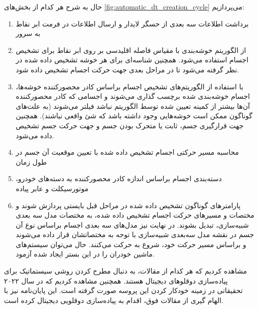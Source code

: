 حال به شرح هر کدام از بخش‌های \cref{fig:automatic_dt_creation_cycle} می‌پردازیم:
\begin{enumerate}
    \item برداشت اطلاعات سه بعدی از حسگر لایدار و ارسال اطلاعات در فرمت ابر نقاط به سرور
    \item از الگوریتم خوشه‌بندی با مقیاس فاصله اقلیدسی بر روی ابر نقاط برای تشخیص اجسام استفاده می‌شود. همچنین شناسه‌ای برای هر خوشه تشخیص داده شده در نظر گرفته می‌شود تا در مراحل بعدی جهت حرکت اجسام تشخیص داده شود.
    \item با استفاده از الگوریتم‌های تشخیص اجسام براساس کادر محصورکننده خوشه‌ها، اجسام خوشه‌بندی شده برچسب‌ گذاری می‌شوند و اجسامی که کادر محصورکننده آن‌ها بیشتر از کمینه تعیین شده توسط الگوریتم نباشد فیلتر می‌شوند (به علت‌های گوناگون ممکن است خوشه‌هایی وجود داشته باشد که شئ واقعی نباشند). همچنین جهت قرارگیری جسم، ثابت یا متحرک بودن جسم و جهت حرکت جسم تشخیص داده می‌شود.
    \item محاسبه مسیر حرکتی اجسام تشخیص داده‌ شده با تعیین موقعیت آن جسم در طول زمان
    \item دسته‌بندی اجسام براساس اندازه کادر محصورکننده به دسته‌های خودرو، موتورسیکلت و عابر پیاده
    \item پارامترهای گوناگون تشخیص داده شده در مراحل قبل بایستی پردازش شوند و مختصات و مسیر‌های حرکت اجسام تشخیص داده شده، به مختصات مدل سه بعدی شبیه‌سازی، تبدیل بشوند. در نهایت نیز مدل‌های سه بعدی اجسام براساس نوع آن جسم در نقشه مدل سه‌بعدی شبیه‌سازی با توجه به مختصاتشان قرار داده ‌می‌شوند و براساس مسیر حرکت خود، شروع به حرکت می‌کنند. حال می‌توان سیستم‌های ماشین‌ خودران را در این بستر ایجاد شده آزمود.
\end{enumerate}

مشاهده کردیم که هر کدام از مقالات، به دنبال مطرح کردن روشی سیستماتیک برای پیاده‌سازی دوقلو‌های دیجیتال هستند. همچنین مشاهده کردیم که در سال ۲۰۲۲ تحقیقاتی در زمینه خودکار کردن این پروسه صورت گرفته است. این پایان‌نامه نیز با الهام گیری از مقالات فوق، اقدام به پیاده‌سازی دوقلویی دیجیتال کرده است.